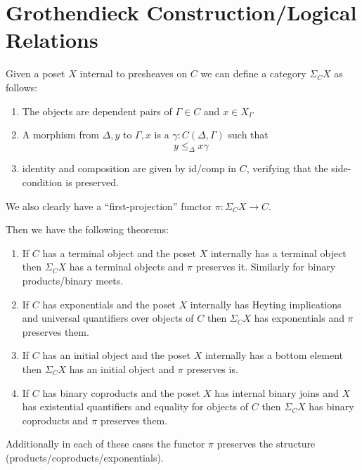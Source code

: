 \documentclass{article}
\begin{document}
\section{Grothendieck Construction/Logical Relations}

Given a poset $X$ internal to presheaves on $C$ we can define a
category $\Sigma_C X$ as follows:
\begin{enumerate}
\item The objects are dependent pairs of $\Gamma \in C$ and $x \in X_\Gamma$
\item A morphism from $\Delta , y$ to $\Gamma , x$ is a $\gamma :
  C(\Delta,\Gamma)$ such that
  \[ y \leq_\Delta x\gamma \]
\item identity and composition are given by id/comp in $C$, verifying
  that the side-condition is preserved.
\end{enumerate}
We also clearly have a ``first-projection'' functor $\pi : \Sigma_C X \to C$.

Then we have the following theorems:
\begin{enumerate}
\item If $C$ has a terminal object and the poset $X$ internally has a
  terminal object then $\Sigma_C X$ has a terminal objects and $\pi$
  preserves it. Similarly for binary products/binary meets.
\item If $C$ has exponentials and the poset $X$ internally has Heyting
  implications and universal quantifiers over objects of $C$ then
  $\Sigma_C X$ has exponentials and $\pi$ preserves them.
\item If $C$ has an initial object and the poset $X$ internally has a
  bottom element then $\Sigma_C X$ has an initial object and $\pi$
  preserves is.
\item If $C$ has binary coproducts and the poset $X$ has internal
  binary joins and $X$ has existential quantifiers and equality for
  objects of $C$ then $\Sigma_C X$ has binary coproducts and $\pi$
  preserves them.
\end{enumerate}
Additionally in each of these cases the functor $\pi$ preserves the
structure (products/coproducts/exponentials).
\end{document}
